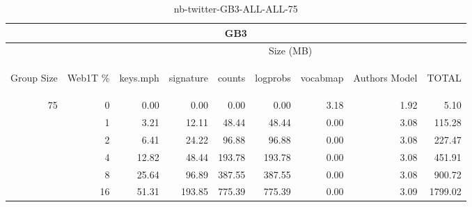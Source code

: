 \begin{center}
\begin{table}[htbp] 
 \begin{center}
\begin{tabular}{ | r | r | r | r | r | r | r | r | r |}
\hline
\multicolumn{9}{|c|}{GB3}\\
\hline
 & & \multicolumn{7}{|c|}{Size (MB)}\\ \cline{3-9}
\begin{sideways}Group Size\end{sideways} & \begin{sideways}Web1T \% \end{sideways} & \begin{sideways}keys.mph\end{sideways} & \begin{sideways}signature\end{sideways} & \begin{sideways}counts\end{sideways} & \begin{sideways}logprobs\end{sideways} & \begin{sideways}vocabmap\end{sideways} & \begin{sideways}Authors Model \end{sideways} & \begin{sideways}TOTAL\end{sideways}\\
\hline
\multirow{5}{*}{75}
 & 0 & 0.00 & 0.00 & 0.00 & 0.00 & 3.18 & 1.92 & 5.10\\ \cline{2-9}
 & 1 & 3.21 & 12.11 & 48.44 & 48.44 & 0.00 & 3.08 & 115.28\\ \cline{2-9}
 & 2 & 6.41 & 24.22 & 96.88 & 96.88 & 0.00 & 3.08 & 227.47\\ \cline{2-9}
 & 4 & 12.82 & 48.44 & 193.78 & 193.78 & 0.00 & 3.08 & 451.91\\ \cline{2-9}
 & 8 & 25.64 & 96.89 & 387.55 & 387.55 & 0.00 & 3.08 & 900.72\\ \cline{2-9}
 & 16 & 51.31 & 193.85 & 775.39 & 775.39 & 0.00 & 3.09 & 1799.02\\ \cline{2-9}
\hline
\end{tabular}
\caption{nb-twitter-GB3-ALL-ALL-75}
\label{table:nb-twitter-GB3-ALL-ALL-75}
\end{center}
 \end{table}
\end{center}

